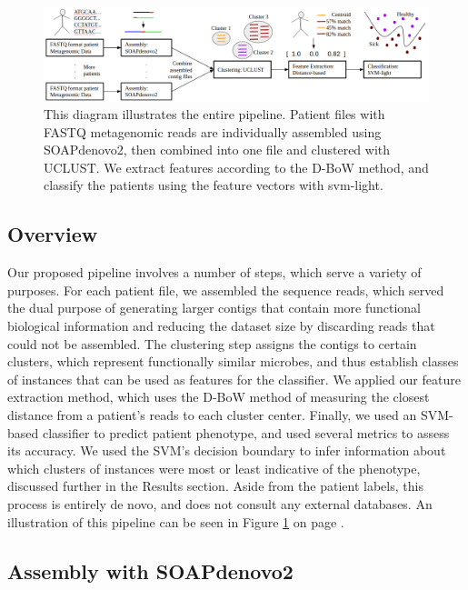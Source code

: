 
\begin{figure}[t]
\centering
\includegraphics[scale=0.5]{./mil-metagenomics-pipeline.png}
\caption{This diagram illustrates the entire pipeline. Patient files with FASTQ metagenomic reads are individually assembled using SOAPdenovo2, then combined into one file and clustered with UCLUST. We extract features according to the D-BoW method, and classify the patients using the feature vectors with svm-light.} \label{pipeline}
\end{figure}

\subsection{Overview}

Our proposed pipeline involves a number of steps, which serve a variety of purposes. For each patient file, we assembled the sequence reads, which served the dual purpose of generating larger contigs that contain more functional biological information and reducing the dataset size by discarding reads that could not be assembled. The clustering step assigns the contigs to certain clusters, which represent functionally similar microbes, and thus establish classes of instances that can be used as features for the classifier. We  applied our feature extraction method, which uses the D-BoW method of measuring the closest distance from a patient's reads to each cluster center. Finally, we used an SVM-based classifier to predict patient phenotype, and used several metrics to assess its accuracy. We used the SVM's decision boundary to infer information about which clusters of instances were most or least indicative of the phenotype, discussed further in the Results section. Aside from the patient labels, this process is entirely de novo, and does not consult any external databases. An illustration of this pipeline can be seen in Figure \ref{pipeline} on page \pageref{pipeline}.

\subsection{Assembly with SOAPdenovo2}


